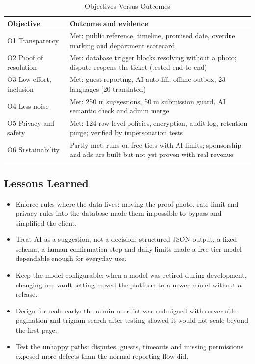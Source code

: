 \documentclass[conference]{IEEEtran}
\begin{document}
\begin{table}[htbp]
\caption{Objectives Versus Outcomes}
\label{tab:9}
\begin{center}
\footnotesize
\begin{tabular}{|>{\raggedright\arraybackslash}p{}|>{\raggedright\arraybackslash}p{}|}
\hline
\textbf{Objective} & \textbf{Outcome and evidence} \\
\hline
O1 Transparency & Met: public reference, timeline, promised date, overdue marking and department scorecard \\ \hline
O2 Proof of resolution & Met: database trigger blocks resolving without a photo; dispute reopens the ticket (tested end to end) \\ \hline
O3 Low effort, inclusion & Met: guest reporting, AI auto-fill, offline outbox, 23 languages (20 translated) \\ \hline
O4 Less noise & Met: 250 m suggestions, 50 m submission guard, AI semantic check and admin merge \\ \hline
O5 Privacy and safety & Met: 124 row-level policies, encryption, audit log, retention purge; verified by impersonation tests \\ \hline
O6 Sustainability & Partly met: runs on free tiers with AI limits; sponsorship and ads are built but not yet proven with real revenue \\ \hline
\end{tabular}
\end{center}
\end{table}
\subsection{Lessons Learned}
\begin{itemize}
\item Enforce rules where the data lives: moving the proof-photo, rate-limit and privacy rules into the database made them impossible to bypass and simplified the client.
\item Treat AI as a suggestion, not a decision: structured JSON output, a fixed schema, a human confirmation step and daily limits made a free-tier model dependable enough for everyday use.
\item Keep the model configurable: when a model was retired during development, changing one vault setting moved the platform to a newer model without a release.
\item Design for scale early: the admin user list was redesigned with server-side pagination and trigram search after testing showed it would not scale beyond the first page.
\item Test the unhappy paths: disputes, guests, timeouts and missing permissions exposed more defects than the normal reporting flow did.
\end{itemize}
\end{document}
